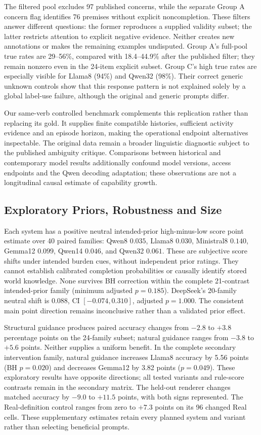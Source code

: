 \documentclass[sigconf,anonymous,review]{acmart}
\begin{document}
The filtered pool excludes 97 published concerns, while the separate Group A concern flag identifies 76 premises without explicit noncompletion. These filters answer different questions: the former reproduces a supplied validity subset; the latter restricts attention to explicit negative evidence. Neither creates new annotations or makes the remaining examples undisputed. Group A's full-pool true rates are 29--56\%, compared with 18.4--44.9\% after the published filter; they remain nonzero even in the 24-item explicit subset. Group C's high true rates are especially visible for Llama8 (94\%) and Qwen32 (98\%). Their correct generic unknown controls show that this response pattern is not explained solely by a global label-use failure, although the original and generic prompts differ.

Our same-verb controlled benchmark complements this replication rather than replacing its gold. It supplies finite compatible histories, sufficient activity evidence and an episode horizon, making the operational endpoint alternatives inspectable. The original data remain a broader linguistic diagnostic subject to the published ambiguity critique. Comparisons between historical and contemporary model results additionally confound model versions, access endpoints and the Qwen decoding adaptation; these observations are not a longitudinal causal estimate of capability growth.

\subsection{Exploratory Priors, Robustness and Size}
Each system has a positive neutral intended-prior high-minus-low score point estimate over 40 paired families: Qwen8 $0.035$, Llama8 $0.030$, Ministral8 $0.140$, Gemma12 $0.099$, Qwen14 $0.046$, and Qwen32 $0.061$. These are subjective score shifts under intended burden cues, without independent prior ratings. They cannot establish calibrated completion probabilities or causally identify stored world knowledge. None survives BH correction within the complete 21-contrast intended-prior family (minimum adjusted $p=0.185$). DeepSeek's 20-family neutral shift is $0.088$, CI $[-0.074,0.310]$, adjusted $p=1.000$. The consistent main point direction remains inconclusive rather than a validated prior effect.

Structural guidance produces paired accuracy changes from $-2.8$ to $+3.8$ percentage points on the 24-family subset; natural guidance ranges from $-3.8$ to $+5.6$ points. Neither supplies a uniform benefit. In the complete secondary intervention family, natural guidance increases Llama8 accuracy by 5.56 points (BH $p=0.020$) and decreases Gemma12 by 3.82 points ($p=0.049$). These exploratory results have opposite directions; all tested variants and rule-score contrasts remain in the secondary matrix. The held-out renderer changes matched accuracy by $-9.0$ to $+11.5$ points, with both signs represented. The Real-definition control ranges from zero to $+7.3$ points on its 96 changed Real cells. These supplementary estimates retain every planned system and variant rather than selecting beneficial prompts.
\end{document}
